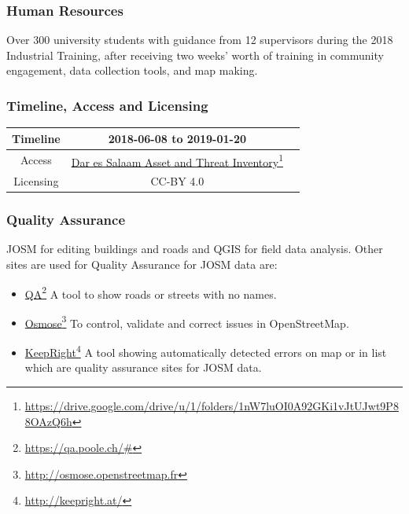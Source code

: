 \documentclass[a4paper,12pt,twoside]{article}
\begin{document}
\subsubsection{Human Resources}
Over 300 university students with guidance from 12 supervisors during the 2018 Industrial Training, after receiving two weeks’ worth of training in community engagement, data collection tools, and map making. 

\subsubsection{Timeline, Access and Licensing}
\begin{center}
\begin{tabular}{|c|c|c|}  
 \hline
  Timeline  &   2018-06-08 to 2019-01-20 \\
\hline  
 Access  & 
    \href{https://drive.google.com/drive/u/1/folders/1nW7luOI0A92GKi1vJtUJwt9P88OAzQ6h}{Dar es Salaam Asset and Threat Inventory}\footnote{\url{https://drive.google.com/drive/u/1/folders/1nW7luOI0A92GKi1vJtUJwt9P88OAzQ6h}} \\
   
\hline 
    Licensing & CC-BY 4.0 \\
\hline
\end{tabular}
\end{center}

\subsubsection{Quality Assurance}
JOSM for editing buildings and roads and QGIS for field data analysis. Other sites are used for Quality Assurance for JOSM data are:
\begin{itemize}
    \item \href{https://qa.poole.ch/\#}{QA}\footnote{\url{https://qa.poole.ch/\#}}
    A tool to show roads or streets with no names.

    \item \href{http://osmose.openstreetmap.fr}{Osmose}\footnote{\url{http://osmose.openstreetmap.fr}}
    To  control, validate and correct issues in OpenStreetMap.

    \item \href{http://keepright.at/}{KeepRight}\footnote{\url{http://keepright.at/}}
    A tool showing automatically detected errors on map or in list which are quality assurance sites for JOSM data.

\end{itemize}
\end{document}
